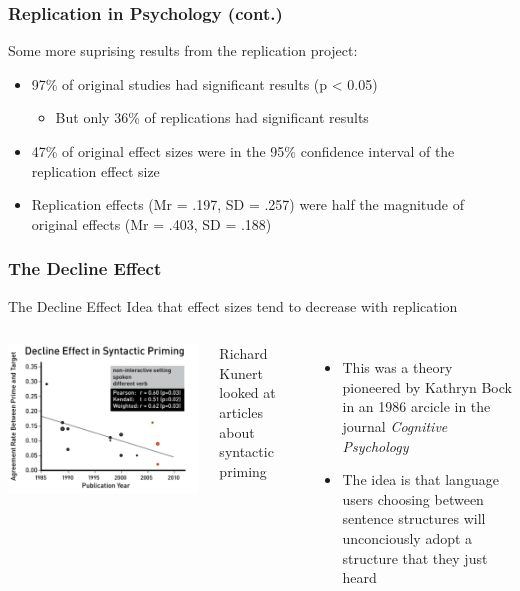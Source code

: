 \documentclass[10pt, block=fill]{beamer}
\begin{document}
\begin{frame}
  \frametitle{Replication in Psychology (cont.)}

  Some more suprising results from the replication project:
  \begin{itemize}
    \item 97\% of original studies had significant results (p < 0.05)
    \begin{itemize}
        \item But only 36\% of replications had significant results
    \end{itemize}
    \item 47\% of original effect sizes were in the 95\% confidence interval of the replication effect size
    \item Replication effects (Mr = .197, SD = .257) were half the magnitude of original effects (Mr = .403, SD = .188)
  \end{itemize}
\end{frame}


\begin{frame}
  \frametitle{The Decline Effect}
  
  \begin{block}{The Decline Effect}
      Idea that effect sizes tend to decrease with replication
  \end{block}
  
  \begin{columns}
    \includegraphics[width=0.95\linewidth]{figures/decline_effect.png}
   
    Richard Kunert looked at articles about syntactic priming
    \begin{itemize}
      \item This was a theory pioneered by Kathryn Bock in an 1986 arcicle in the journal \textit{Cognitive Psychology}
      \item The idea is that language users choosing between sentence structures will unconciously adopt a structure that they just heard
    \end{itemize}
  \end{columns}

\end{frame}
\end{document}
